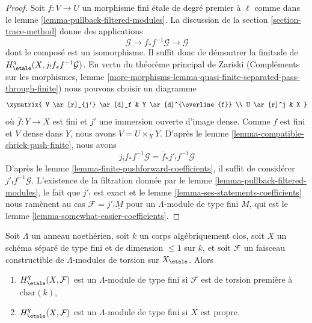 \begin{proof}
Soit $f : V \to U$ un morphisme fini étale de degré premier à $\ell$
comme dans le lemme \ref{lemma-pullback-filtered-modules}. La discussion de la
section \ref{section-trace-method} donne des applications
$$
\mathcal{G} \to f_*f^{-1}\mathcal{G} \to \mathcal{G}
$$
dont le composé est un isomorphisme. Il suffit donc de démontrer la
finitude de $H^q_\etale(X, j_!f_*f^{-1}\mathcal{G})$.
En vertu du théorème principal de Zariski
(Compléments sur les morphismes, lemme
\ref{more-morphisms-lemma-quasi-finite-separated-pass-through-finite})
nous pouvons choisir un diagramme
$$
\xymatrix{
V \ar[r]_{j'} \ar[d]_f & Y \ar[d]^{\overline{f}} \\
U \ar[r]^j & X
}
$$
où $\overline{f} : Y \to X$ est fini et $j'$ une immersion ouverte d'image
dense. Comme $f$ est fini et $V$ dense dans $Y$, nous avons
$V = U \times_X Y$. D'après le lemme \ref{lemma-compatible-shriek-push-finite}, nous avons
$$
j_!f_*f^{-1}\mathcal{G} = \overline{f}_*j'_!f^{-1}\mathcal{G}
$$
D'après le lemme \ref{lemma-finite-pushforward-coefficients}, il suffit de
considérer $j'_!f^{-1}\mathcal{G}$. L'existence de la filtration donnée par le
lemme \ref{lemma-pullback-filtered-modules},
le fait que $j'_!$ est exact et le
lemme \ref{lemma-ses-statements-coefficients}
nous ramènent au cas
$\mathcal{F} = j'_!\underline{M}$ pour un $\Lambda$-module de type fini $M$,
qui est le lemme \ref{lemma-somewhat-easier-coefficients}.
\end{proof}

\begin{theorem}
\label{theorem-vanishing-affine-curves-coefficients}
Soit $\Lambda$ un anneau noethérien, soit $k$ un corps algébriquement clos,
soit $X$ un schéma séparé de type fini et de dimension $\leq 1$ sur $k$,
et soit $\mathcal{F}$ un faisceau constructible de $\Lambda$-modules
de torsion sur $X_\etale$. Alors
\begin{enumerate}
\item
\label{item-finite-prime-to-p-coefficients}
$H^q_\etale(X, \mathcal{F})$ est un $\Lambda$-module de type fini
si $\mathcal{F}$ est de torsion première à $\text{char}(k)$,
\item
\label{item-finite-proper-coefficients}
$H^q_\etale(X, \mathcal{F})$ est un $\Lambda$-module de type fini si $X$ est propre.
\end{enumerate}
\end{theorem}

